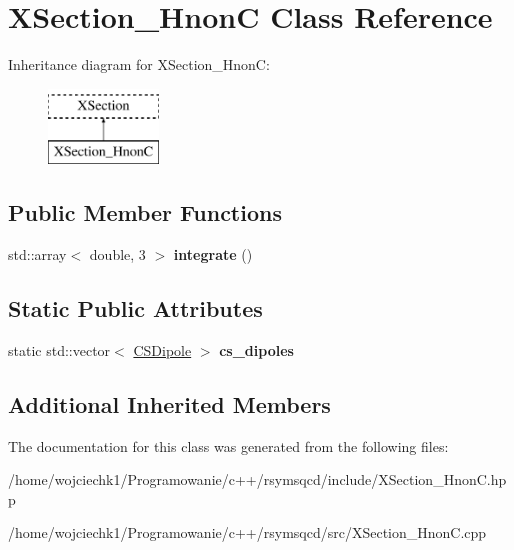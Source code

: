 \hypertarget{classXSection__HnonC}{}\section{X\+Section\+\_\+\+HnonC Class Reference}
\label{classXSection__HnonC}
Inheritance diagram for X\+Section\+\_\+\+HnonC\+:\begin{figure}[H]
\begin{center}
\leavevmode
\includegraphics[height=2.000000cm]{classXSection__HnonC}
\end{center}
\end{figure}
\subsection*{Public Member Functions}
\begin{DoxyCompactItemize}
\item 
\mbox{\label{classXSection__HnonC_a5eef4450e024b498769ff1d02ec4cdd6}} 
std\+::array$<$ double, 3 $>$ {\bfseries integrate} ()
\end{DoxyCompactItemize}
\subsection*{Static Public Attributes}
\begin{DoxyCompactItemize}
\item 
\mbox{\label{classXSection__HnonC_aa578c0b49a19199ded7783b3e9457ad7}} 
static std\+::vector$<$ \hyperlink{classCSDipole}{C\+S\+Dipole} $>$ {\bfseries cs\+\_\+dipoles}
\end{DoxyCompactItemize}
\subsection*{Additional Inherited Members}


The documentation for this class was generated from the following files\+:\begin{DoxyCompactItemize}
\item 
/home/wojciechk1/\+Programowanie/c++/rsymsqcd/include/X\+Section\+\_\+\+Hnon\+C.\+hpp\item 
/home/wojciechk1/\+Programowanie/c++/rsymsqcd/src/X\+Section\+\_\+\+Hnon\+C.\+cpp\end{DoxyCompactItemize}
